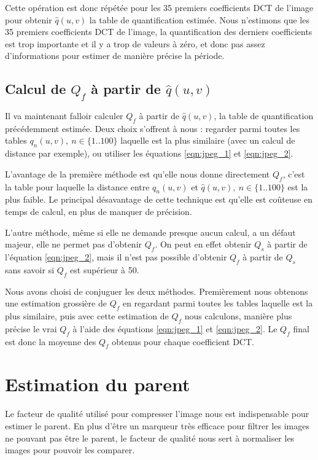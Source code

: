 \documentclass[utf8,final]{stageM2R} %
\begin{document}
Cette opération est donc répétée pour les 35 premiers coefficients DCT de l'image pour obtenir $\widehat{q}(u,v)$ la table de quantification estimée. Nous n'estimons que les 35 premiers coefficients DCT de l'image, la quantification des derniers coefficients est trop importante et il y a trop de valeurs à zéro, et donc pas assez d'informations pour estimer de manière précise la période.

\subsection{Calcul de $Q_f$ à partir de $\widehat{q}(u,v)$}
Il va maintenant falloir calculer $Q_f$ à partir de $\widehat{q}(u,v)$, la table de quantification précédemment estimée. Deux choix s'offrent à nous : regarder parmi toutes les tables $q_n(u,v),\ n\in\{1..100\}$ laquelle est la plus similaire (avec un calcul de distance par exemple), ou utiliser les équations \ref{eqn:jpeg_1} et \ref{eqn:jpeg_2}. 

L'avantage de la première méthode est qu'elle nous donne directement $Q_f$, c'est la table pour laquelle la distance entre $q_n(u,v)$ et $\widehat{q}(u,v),\ n\in \{1..100\}$ est la plus faible. Le principal désavantage de cette technique est qu'elle est coûteuse en temps de calcul, en plus de manquer de précision.

L'autre méthode, même si elle ne demande presque aucun calcul, a un défaut majeur, elle ne permet pas d'obtenir $Q_f$. On peut en effet obtenir $Q_s$ à partir de l'équation \ref{eqn:jpeg_2}, mais il n'est pas possible d'obtenir $Q_f$ à partir de $Q_s$ sans savoir si $Q_f$ est supérieur à 50.

Nous avons choisi de conjuguer les deux méthodes. Premièrement nous obtenons une estimation grossière de $Q_f$ en regardant parmi toutes les tables laquelle est la plus similaire, puis avec cette estimation de $Q_f$ nous calculons, manière plus précise le vrai $Q_f$ à l'aide des équations \ref{eqn:jpeg_1} et \ref{eqn:jpeg_2}. Le $Q_f$ final est donc la moyenne des $Q_f$ obtenus pour chaque coefficient DCT.

\section{Estimation du parent}
Le facteur de qualité utilisé pour compresser l'image nous est indispensable pour estimer le parent. En plus d'être un marqueur très efficace pour filtrer les images ne pouvant pas être le parent, le facteur de qualité nous sert à normaliser les images pour pouvoir les comparer.
\end{document}
